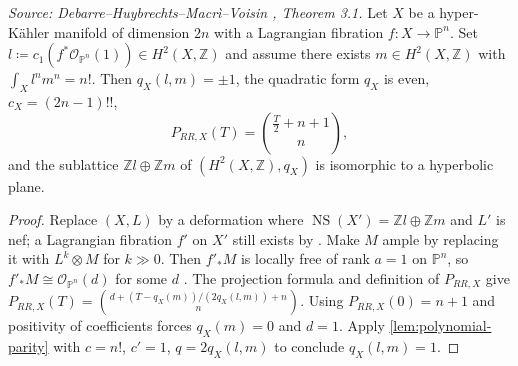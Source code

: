 \begin{theorem}[HRR polynomial from a Lagrangian fibration with \(a=1\)]
  \label{thm:hrr-from-lagrangian}
  \textit{Source: Debarre--Huybrechts--Macr\`i--Voisin \cite{MR4654610}, Theorem 3.1.}
  Let \(X\) be a hyper-K\"ahler manifold of dimension \(2n\) with a Lagrangian fibration
  \(f \colon X \to \mathbb{P}^n\).  Set
  \(l \coloneqq c_1(f^*\mathcal{O}_{\mathbb{P}^n}(1)) \in H^2(X, \mathbb{Z})\) and assume
  there exists \(m \in H^2(X, \mathbb{Z})\) with \(\int_X l^n m^n = n!\).  Then
  \(q_X(l,m) = \pm 1\), the quadratic form \(q_X\) is even, \(c_X = (2n-1)!!\),
  \[
    P_{RR,X}(T) = \binom{\tfrac{T}{2} + n + 1}{n},
  \]
  and the sublattice \(\mathbb{Z}l \oplus \mathbb{Z}m\) of \((H^2(X, \mathbb{Z}), q_X)\)
  is isomorphic to a hyperbolic plane.
\end{theorem}

\begin{proof}
  Replace \((X, L)\) by a deformation where \(\operatorname{NS}(X') = \mathbb{Z}l \oplus \mathbb{Z}m\)
  and \(L'\) is nef; a Lagrangian fibration \(f'\) on \(X'\) still exists by
  \cite[Theorem~1.2, Claims~3.1--3.2]{mat:isotropic}.  Make \(M\) ample by replacing it
  with \(L^k \otimes M\) for \(k \gg 0\).  Then \(f'_*M\) is locally free of rank \(a = 1\)
  on \(\mathbb{P}^n\), so \(f'_*M \cong \mathcal{O}_{\mathbb{P}^n}(d)\) for some \(d\)
  \cite[Section~3]{ort}.  The projection formula and definition of \(P_{RR,X}\) give
  \(P_{RR,X}(T) = \binom{d + (T - q_X(m))/(2q_X(l,m)) + n}{n}\).  Using
  \(P_{RR,X}(0) = n+1\) and positivity of coefficients forces \(q_X(m) = 0\) and \(d = 1\).
  Apply \cref{lem:polynomial-parity} with \(c = n!\), \(c' = 1\), \(q = 2q_X(l,m)\) to
  conclude \(q_X(l,m) = 1\).
\end{proof}

